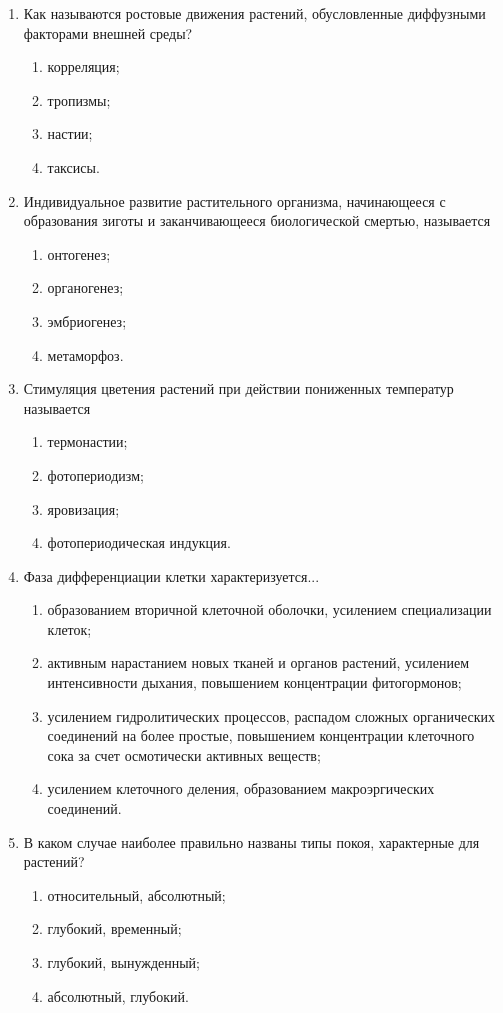 \begin{enumerate}
\item Как называются ростовые движения растений, обусловленные диффузными факторами внешней среды?
\begin{enumerate}
	\item корреляция; 
	\item тропизмы; 
	\item настии; 
	\item таксисы.
\end{enumerate}

\item Индивидуальное развитие растительного организма, начинающееся с образования зиготы и заканчивающееся биологической смертью, называется
\begin{enumerate}
	\item онтогенез; 
	\item органогенез; 
	\item эмбриогенез; 
	\item метаморфоз.
\end{enumerate}

\item Стимуляция цветения растений при действии пониженных температур называется 
\begin{enumerate}
	\item термонастии; 
	\item фотопериодизм; 
	\item яровизация; 
	\item фотопериодическая индукция.
\end{enumerate}

\item Фаза дифференциации клетки характеризуется...
\begin{enumerate}
	\item образованием вторичной клеточной оболочки, усилением специализации клеток; 
	\item активным нарастанием новых тканей и органов растений, усилением интенсивности дыхания, повышением концентрации фитогормонов; 
	\item усилением гидролитических процессов, распадом сложных органических соединений на более простые, повышением концентрации клеточного сока за счет осмотически активных веществ; 
	\item усилением клеточного деления, образованием макроэргических соединений.
\end{enumerate}

\item В каком случае наиболее правильно названы типы покоя, характерные для растений?
\begin{enumerate}
	\item относительный, абсолютный; 
	\item глубокий, временный; 
	\item глубокий, вынужденный; 
	\item абсолютный, глубокий.
\end{enumerate}


\end{enumerate}
